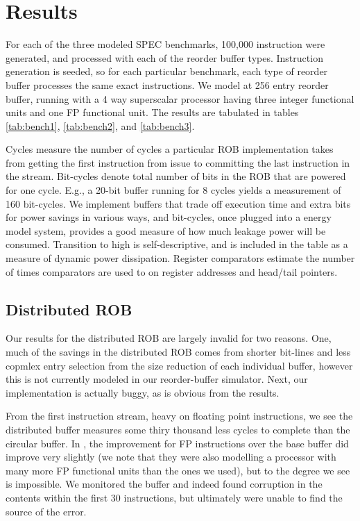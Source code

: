 \def\topfraction{.9}
\def\floatpagefraction{.8}

\section{Results}
For each of the three modeled SPEC benchmarks, 100,000 instruction were generated, and processed with each of the reorder buffer types. Instruction generation is seeded, so for each particular benchmark, each type of reorder buffer processes the same exact instructions. We model at 256 entry reorder buffer, running with a 4 way superscalar processor having three integer functional units and one FP functional unit. The results are tabulated in tables \ref{tab:bench1}, \ref{tab:bench2}, and \ref{tab:bench3}.

Cycles measure the number of cycles a particular ROB implementation takes from getting the first instruction from issue to committing the last instruction in the stream. Bit-cycles denote total number of bits in the ROB that are powered for one cycle. E.g., a 20-bit buffer running for 8 cycles yields a measurement of 160 bit-cycles. We implement buffers that trade off execution time and extra bits for power savings in various ways, and bit-cycles, once plugged into a energy model system, provides a good measure of how much leakage power will be consumed. Transition to high is self-descriptive, and is included in the table as a measure of dynamic power dissipation. Register comparators estimate the number of times comparators are used to on register addresses and head/tail pointers.

\subsection{Distributed ROB}

Our results for the distributed ROB are largely invalid for two reasons. One, much of the savings in the distributed ROB comes from shorter bit-lines and less copmlex entry selection from the size reduction of each individual buffer, however this is not currently modeled in our reorder-buffer simulator. Next, our implementation is actually buggy, as is obvious from the results.

From the first instruction stream, heavy on floating point instructions, we see the distributed buffer measures some thiry thousand less cycles to complete than the circular buffer. In \cite{kucuk4}, the improvement for FP instructions over the base buffer did improve very slightly (we note that they were also modelling a processor with many more FP functional units than the ones we used), but to the degree we see is impossible. We monitored the buffer and indeed found corruption in the contents within the first 30 instructions, but ultimately were unable to find the source of the error.

